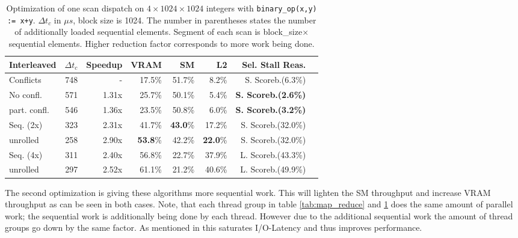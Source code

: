 \documentclass[m,times]{cgMA}
\begin{document}
\begin{table}[htpb]
  \begin{tabular}{ | l | r | r | r | r | r | r | r |}    \hline
    Interleaved       &  $\Delta t_c$         & Speedup &VRAM              & SM      & L2     & Sel. Stall Reas.\\\hline
    Conflicts           & 748                   & -       &17.5\%            & 51.7\%  & 8.2\%  & S. Scoreb.(6.3\%)\\\hline
    No confl.           & 571                   & 1.31x   &25.7\%            & 50.1\%  & 5.4\%  & \textbf{S. Scoreb.(2.6\%)}\\\hline
    part. confl.        & 546                   & 1.36x   &23.5\%            & 50.8\%  & 6.0\%  & \textbf{S. Scoreb.(3.2\%)} \\\hline\hline
    Seq. (2x)           & 323                   & 2.31x   &41.7\%            & \textbf{43.0}\%  & 17.2\% & S. Scoreb.(32.0\%)\\\hline
    unrolled            & 258                   & 2.90x   &\textbf{53.8}\%   & 42.2\%  & \textbf{22.0}\% & S. Scoreb.(32.0\%)\\\hline\hline
    Seq. (4x)           & 311                   & 2.40x   &56.8\%            & 22.7\%  & 37.9\% & L. Scoreb.(43.3\%)\\\hline
    unrolled            & 297                   & 2.52x   &61.1\%            & 21.2\%  & 40.6\% & L. Scoreb.(49.9\%)\\
    \hline
  \end{tabular}
  \caption{Optimization of one scan dispatch on $4 \times 1024\times1024$ integers with \texttt{binary\_op(x,y) := x+y}. $\Delta t_c$ in $\mu s$, block size is 1024. The number in parentheses states the number of additionally loaded sequential elements. Segment of each scan is block\_size$\times$ sequential elements. Higher reduction factor corresponds to more work being done.}\label{tab:scan}
\end{table}
The second optimization is giving these algorithms more sequential work. This will lighten the SM throughput and increase VRAM throughput as can be seen in both cases. Note, that each thread group in table \ref{tab:map_reduce} and \ref{tab:scan} does the same amount of parallel work; the sequential work is additionally being done by each thread. However due to the additional sequential work the amount of thread groups go down by the same factor. As mentioned in \cite{NVIDIA:PARALLEL_REDUCTION} this saturates I/O-Latency and thus improves performance.
\end{document}
